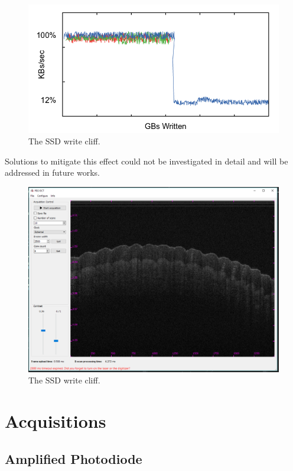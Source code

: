 \begin{figure}[htb]
	\myfloatalign
	\includegraphics[width=0.8\linewidth]{gfx/ch4/write-cliff}
	\caption{The SSD write cliff.}\label{fig:write-cliff}
\end{figure}

Solutions to mitigate this effect could not be investigated in detail and will be addressed in future works. 


\begin{figure}[htb]
	\myfloatalign
	\includegraphics[width=0.8\linewidth]{gfx/ch4/gui}
	\caption{The SSD write cliff.}\label{fig:gui}
\end{figure}

\section{Acquisitions}
\subsection{Amplified Photodiode}



